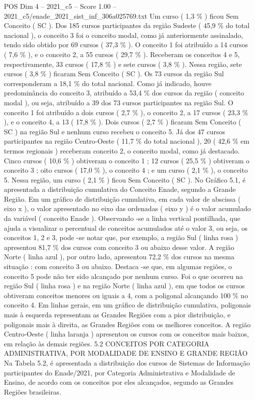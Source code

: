 \begin{textsample}{POS Dim 4 – 2021\_c5 – Score 1.00 – 2021\_c5/enade\_2021\_sist\_inf\_306a025769.txt}
Um curso ( 1,3 \% ) ficou Sem Conceito ( SC ).
Dos 185 cursos participantes da região Sudeste ( 45,9 \% do total nacional ), o conceito 3 foi o conceito modal, como já anteriormente assinalado, tendo sido obtido por 69 cursos ( 37,3 \% ).
O conceito 1 foi atribuído a 14 cursos ( 7,6 \% ), e o conceito 2, a 55 cursos ( 29,7 \% ).
Receberam os conceitos 4 e 5, respectivamente, 33 cursos ( 17,8 \% ) e sete cursos ( 3,8 \% ).
Nessa região, sete cursos ( 3,8 \% ) ficaram Sem Conceito ( SC ).
Os 73 cursos da região Sul corresponderam a 18,1 \% do total nacional.
Como já indicado, houve predominância do conceito 3, atribuído a 53,4 \% dos cursos da região ( conceito modal ), ou seja, atribuído a 39 dos 73 cursos participantes na região Sul.
O conceito 1 foi atribuído a dois cursos ( 2,7 \% ), o conceito 2, a 17 cursos ( 23,3 \% ), e o conceito 4, a 13 ( 17,8 \% ).
Dois cursos ( 2,7 \% ) ficaram Sem Conceito ( SC ) na região Sul e nenhum curso recebeu o conceito 5.
Já dos 47 cursos participantes na região Centro-Oeste ( 11,7 \% do total nacional ), 20 ( 42,6 \% em termos regionais ) receberam conceito 2, o conceito modal, como já destacado.
Cinco cursos ( 10,6 \% ) obtiveram o conceito 1 ; 12 cursos ( 25,5 \% ) obtiveram o conceito 3 ; oito cursos ( 17,0 \% ), o conceito 4 ; e um curso ( 2,1 \% ), o conceito 5.
Nessa região, um curso ( 2,1 \% ) ficou Sem Conceito ( SC ).
No Gráfico 5.1, é apresentada a distribuição cumulativa do Conceito Enade, segundo a Grande Região.
Em um gráfico de distribuição cumulativa, em cada valor de abscissa ( eixo x ), o valor apresentado no eixo das ordenadas ( eixo y ) é o valor acumulado da variável ( conceito Enade ).
Observando -se a linha vertical pontilhada, que ajuda a visualizar o percentual de conceitos acumulados até o valor 3, ou seja, os conceitos 1, 2 e 3, pode -se notar que, por exemplo, a região Sul ( linha rosa ) apresentou 81,7 \% dos cursos com conceito 3 ou abaixo desse valor.
A região Norte ( linha azul ), por outro lado, apresentou 72,2 \% dos cursos na mesma situação : com conceito 3 ou abaixo.
Destaca -se que, em algumas regiões, o conceito 5 pode não ter sido alcançado por nenhum curso.
Foi o que ocorreu na região Sul ( linha rosa ) e na região Norte ( linha azul ), em que todos os cursos obtiveram conceitos menores ou iguais a 4, com a poligonal alcançando 100 \% no conceito 4.
Em linhas gerais, em um gráfico de distribuição cumulativa, poligonais mais à esquerda representam as Grandes Regiões com a pior distribuição, e poligonais mais à direita, as Grandes Regiões com os melhores conceitos.
A região Centro-Oeste ( linha laranja ) apresentou os cursos com os conceitos mais baixos, em relação às demais regiões. 5.2 CONCEITOS POR CATEGORIA ADMINISTRATIVA, POR MODALIDADE DE ENSINO E GRANDE REGIÃO Na Tabela 5.2, é apresentada a distribuição dos cursos de Sistemas de Informação participantes do Enade/2021, por Categoria Administrativa e Modalidade de Ensino, de acordo com os conceitos por eles alcançados, segundo as Grandes Regiões brasileiras.

\end{textsample}

